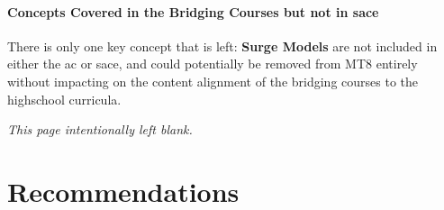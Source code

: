 \documentclass[twoside,12pt,a4paper]{report}
\makeatletter
\newcommand*{\intentionallyblankpage}{
  \vspace*{\fill}
  {\centering \textit{This page intentionally left blank.} \par}
  \vspace{\fill}}
\renewcommand*{\cleardoublepage}{\clearpage\if@twoside \ifodd\c@page\else
  \intentionallyblankpage
  \newpage
  \if@twocolumn\hbox{}\newpage\fi\fi\fi}
\makeatother
\begin{document}
\subsubsection{Concepts Covered in the Bridging Courses but not in \gls{sace}}

There is only one key concept that is left: \textbf{Surge Models} are not included in either the \gls{ac} or \gls{sace}, and could potentially be removed from MT8 entirely without impacting on the content alignment of the bridging courses to the highschool curricula.	






\cleardoublepage
\chapter{Recommendations}
\label{chap:recommendations}
\end{document}
